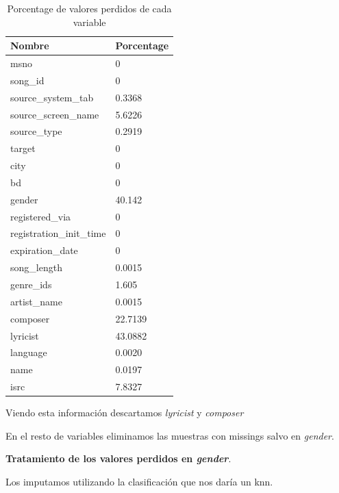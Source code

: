 \documentclass[a4paper]{article}
\begin{document}
\begin{table}[H]
\centering
\label{my-label}
\begin{tabular}{|l|l|}
\hline
Nombre                   & Porcentage \\ \hline
msno                     & 0          \\ \hline
song\_id                 & 0          \\ \hline
source\_system\_tab      & 0.3368     \\ \hline
source\_screen\_name     & 5.6226     \\ \hline
source\_type             & 0.2919     \\ \hline
target                   & 0          \\ \hline
city                     & 0          \\ \hline
bd                       & 0          \\ \hline
gender                   & 40.142     \\ \hline
registered\_via          & 0          \\ \hline
registration\_init\_time & 0          \\ \hline
expiration\_date         & 0          \\ \hline
song\_length             & 0.0015     \\ \hline
genre\_ids               & 1.605      \\ \hline
artist\_name             & 0.0015     \\ \hline
composer                 & 22.7139    \\ \hline
lyricist                 & 43.0882    \\ \hline
language                 & 0.0020     \\ \hline
name                     & 0.0197     \\ \hline
isrc                     & 7.8327     \\ \hline
\end{tabular}
\caption{Porcentage de valores perdidos de cada variable}
\end{table}


Viendo esta información descartamos \textit{lyricist} y \textit{composer}

En el resto de variables eliminamos las muestras con missings salvo en \textit{gender}. 

\textbf{Tratamiento de los valores perdidos en \textit{gender}}.

Los imputamos utilizando la clasificación que nos daría un knn.
\end{document}
